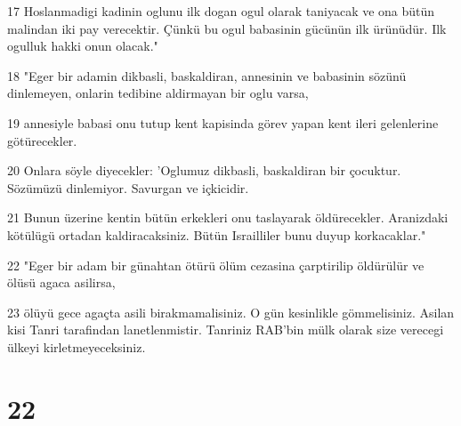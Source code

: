 \par 17 Hoslanmadigi kadinin oglunu ilk dogan ogul olarak taniyacak ve ona bütün malindan iki pay verecektir. Çünkü bu ogul babasinin gücünün ilk ürünüdür. Ilk ogulluk hakki onun olacak."
\par 18 "Eger bir adamin dikbasli, baskaldiran, annesinin ve babasinin sözünü dinlemeyen, onlarin tedibine aldirmayan bir oglu varsa,
\par 19 annesiyle babasi onu tutup kent kapisinda görev yapan kent ileri gelenlerine götürecekler.
\par 20 Onlara söyle diyecekler: 'Oglumuz dikbasli, baskaldiran bir çocuktur. Sözümüzü dinlemiyor. Savurgan ve içkicidir.
\par 21 Bunun üzerine kentin bütün erkekleri onu taslayarak öldürecekler. Aranizdaki kötülügü ortadan kaldiracaksiniz. Bütün Israilliler bunu duyup korkacaklar."
\par 22 "Eger bir adam bir günahtan ötürü ölüm cezasina çarptirilip öldürülür ve ölüsü agaca asilirsa,
\par 23 ölüyü gece agaçta asili birakmamalisiniz. O gün kesinlikle gömmelisiniz. Asilan kisi Tanri tarafindan lanetlenmistir. Tanriniz RAB'bin mülk olarak size verecegi ülkeyi kirletmeyeceksiniz.

\chapter{22}

